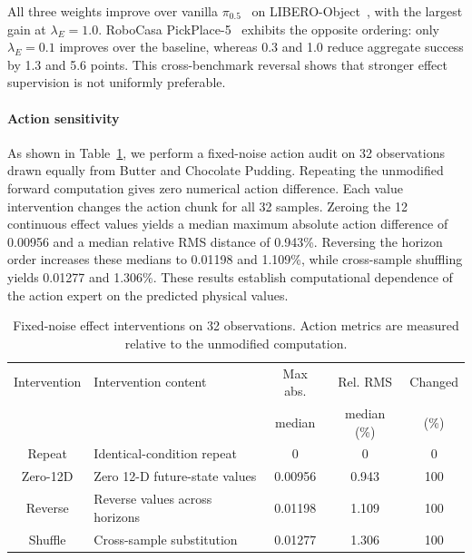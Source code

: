 \documentclass[letterpaper,10pt,conference]{ieeeconf}
\newcommand{\pihalf}{\ensuremath{\pi_{0.5}}}
\begin{document}
All three weights improve over vanilla \pihalf{}~\cite{pi05} on LIBERO-Object~\cite{libero}, with the largest gain at $\lambda_E=1.0$.
RoboCasa PickPlace-5~\cite{robocasa2024} exhibits the opposite ordering: only $\lambda_E=0.1$ improves over the baseline, whereas 0.3 and 1.0 reduce aggregate success by 1.3 and 5.6 points.
This cross-benchmark reversal shows that stronger effect supervision is not uniformly preferable.

\paragraph{Action sensitivity}

As shown in Table~\ref{tab:interventions}, we perform a fixed-noise action audit on 32 observations drawn equally from Butter and Chocolate Pudding.
Repeating the unmodified forward computation gives zero numerical action difference.
Each value intervention changes the action chunk for all 32 samples.
Zeroing the 12 continuous effect values yields a median maximum absolute action difference of 0.00956 and a median relative RMS distance of 0.943\%.
Reversing the horizon order increases these medians to 0.01198 and 1.109\%, while cross-sample shuffling yields 0.01277 and 1.306\%.
These results establish computational dependence of the action expert on the predicted physical values.

\begin{table}[t]
\caption{Fixed-noise effect interventions on 32 observations.
Action metrics are measured relative to the unmodified computation.}
\label{tab:interventions}
\centering
\scriptsize
\setlength{\tabcolsep}{2.5pt}
\begin{tabular}{@{}c>{\centering\arraybackslash}p{1.25in}ccc@{}}
\toprule
Intervention & Intervention content & Max abs. & Rel. RMS & Changed \\
             &                      & median   & median (\%) & (\%) \\
\midrule
Repeat   & Identical-condition repeat       & 0       & 0     & 0   \\
Zero-12D & Zero 12-D future-state values    & 0.00956 & 0.943 & 100 \\
Reverse  & Reverse values across horizons   & 0.01198 & 1.109 & 100 \\
Shuffle  & Cross-sample substitution        & 0.01277 & 1.306 & 100 \\
\bottomrule
\end{tabular}
\end{table}
\end{document}
